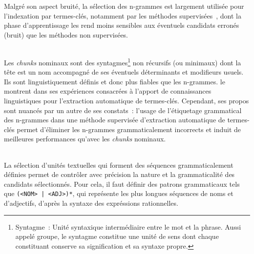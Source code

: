     Malgré son aspect bruité, la sélection des n-grammes est largement utilisée
    pour l'indexation par termes-clés, notamment par les méthodes
    supervisées~\cite{witten1999kea,turney1999learningalgorithms,hulth2003keywordextraction},
    dont la phase d'apprentissage les rend moins sensibles aux éventuels
    candidats erronés (bruit) que les méthodes non supervisées.

    \begin{example}
    \end{example}

    ~\\Les \textit{chunks} nominaux
    sont des syntagmes\footnote{Syntagme~: Unité syntaxique
    intermédiaire entre le mot et la phrase. Aussi appelé groupe, le syntagme
    constitue une unité de sens dont chaque constituant conserve sa
    signification et sa syntaxe propre.} non récursifs (ou minimaux) dont la
    tête est un nom accompagné de ses éventuels déterminants et modifieurs
    usuels. Ils sont linguistiquement définis et donc plus fiables que les
    n-grammes.  le montrent dans ses
    expériences consacrées à l'apport de connaissances linguistiques pour
    l'extraction automatique de termes-clés. Cependant, ses propos sont nuancés
    par un autre de ses constats~: l'usage de l'étiquetage grammatical des
    n-grammes dans une méthode supervisée d'extraction automatique de
    termes-clés permet d'éliminer les n-grammes grammaticalement incorrects et
    induit de meilleures performances qu'avec les \textit{chunks} nominaux.

    \begin{example}
    \end{example}

    ~\\La sélection d'unités textuelles qui forment des séquences
    grammaticalement définies permet de contrôler
    avec précision la nature et la grammaticalité des candidats sélectionnés.
    Pour cela, il faut définir des patrons grammaticaux tels que \texttt{(<NOM>
    | <ADJ>)*}, qui représente les plus longues séquences de noms et
    d'adjectifs, d'après la syntaxe des expréssions rationnelles.


